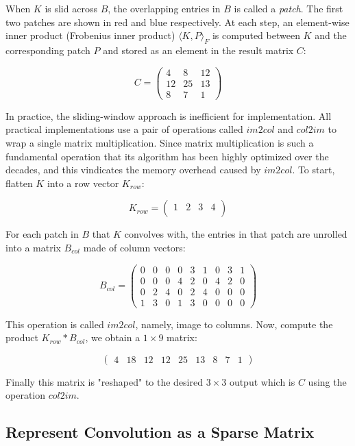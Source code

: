 When $K$ is slid across $B$, the overlapping entries in $B$ is called a \textit{patch}. The first two
patches are shown in red and blue respectively. At each step, an element-wise inner product (Frobenius inner
product) $\langle K,P \rangle_{F}$ is computed between $K$ and the corresponding patch $P$ and stored as
an element in the result matrix $C$:

$$
C =
  \begin{pmatrix}
    4 & 8 & 12 \\
    12 & 25 & 13 \\
    8 & 7 & 1
  \end{pmatrix}
$$

In practice, the sliding-window approach is inefficient for implementation. All practical implementations
use a pair of operations called $im2col$ and $col2im$ to wrap a single matrix multiplication. Since
matrix multiplication is such a fundamental operation that its algorithm has been highly optimized over the
decades, and this vindicates the memory overhead caused by $im2col$. To start, flatten $K$ into a row vector
$K_{row}$:

$$
K_{row} =
  \begin{pmatrix}
    1 & 2 & 3 & 4 \\
  \end{pmatrix}
$$

For each patch in $B$ that $K$ convolves with, the entries in that patch are unrolled into a matrix $B_{col}$
made of column vectors:

$$
B_{col} =
  \begin{pmatrix}
    0 & 0 & 0 & 0 & 3 & 1 & 0 & 3 & 1 \\
    0 & 0 & 0 & 4 & 2 & 0 & 4 & 2 & 0 \\
    0 & 2 & 4 & 0 & 2 & 4 & 0 & 0 & 0 \\
    1 & 3 & 0 & 1 & 3 & 0 & 0 & 0 & 0
  \end{pmatrix}
$$

This operation is called $im2col$, namely, image to columns. Now, compute the product $K_{row} * B_{col}$, we
obtain a $1 \times 9$ matrix:

$$
\begin{pmatrix}
  4 & 18 & 12 & 12 & 25 & 13 & 8 & 7 & 1
\end{pmatrix}
$$

Finally this matrix is "reshaped" to the desired $3 \times 3$ output which is $C$ using the operation $col2im$.

\subsection{Represent Convolution as a Sparse Matrix}

